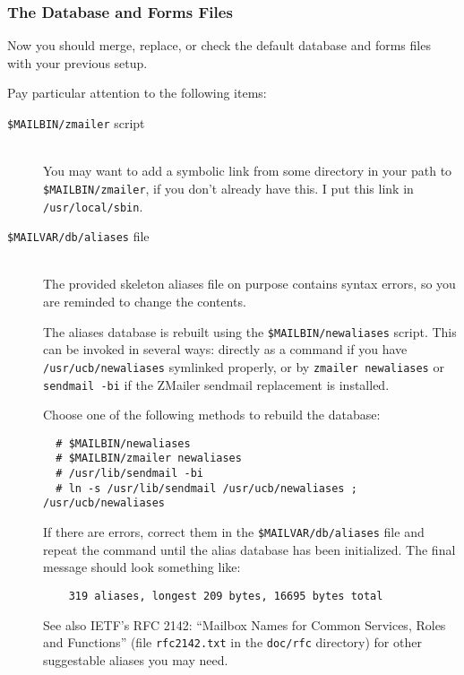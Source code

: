 \subsubsection{The Database and Forms Files}%
%
%
%

Now you should merge, replace, or check the default database and
forms files with your previous setup.

Pay particular attention to the following items:
\begin{description}
\item[{\tt \$MAILBIN/zmailer} script] \mbox{} \\

You may want to add a symbolic link from some directory in your path
to {\tt \$MAILBIN/zmailer}, if you don't already have this.  I put this link
in {\tt /usr/local/sbin}.

\item[{\tt \$MAILVAR/db/aliases} file] \mbox{} \\

The provided skeleton aliases file on purpose contains syntax errors,
so you are reminded to change the contents.

The aliases database is rebuilt using the {\tt \$MAILBIN/newaliases} script.
This can be invoked in several ways: directly as a command if you
have {\tt /usr/ucb/newaliases} symlinked properly, or by {\tt zmailer newaliases}
or {\tt sendmail -bi} if the ZMailer sendmail replacement is installed.

Choose one of the following methods to rebuild the database:
\begin{verbatim}
  # $MAILBIN/newaliases
  # $MAILBIN/zmailer newaliases
  # /usr/lib/sendmail -bi
  # ln -s /usr/lib/sendmail /usr/ucb/newaliases ; /usr/ucb/newaliases
\end{verbatim}

If there are errors, correct them in the {\tt \$MAILVAR/db/aliases} file
and repeat the command until the alias database has been initialized.
The final message should look something like:
\begin{verbatim}
    319 aliases, longest 209 bytes, 16695 bytes total
\end{verbatim}

See also IETF's RFC 2142: ``Mailbox Names for Common Services, Roles and
Functions'' (file {\tt rfc2142.txt} in the {\tt doc/rfc} directory) 
for other suggestable aliases you may need. 
                                                               

\end{description}
